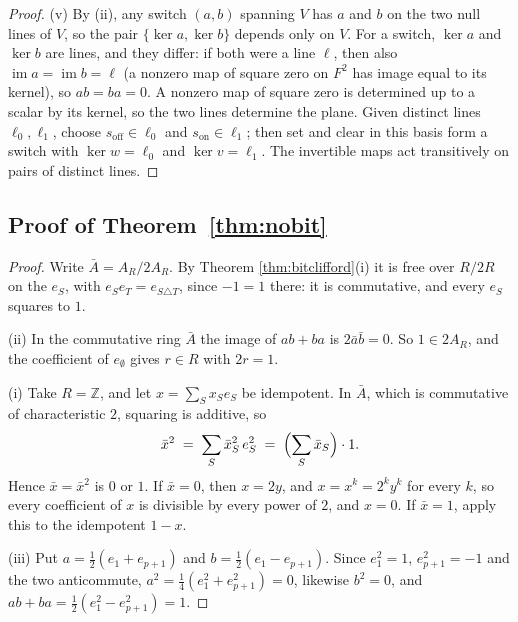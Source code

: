 \documentclass[11pt]{article}
\theoremstyle{plain}
\theoremstyle{definition}
\theoremstyle{plain}
\theoremstyle{definition}
\newcommand{\Z}{\mathbb{Z}}
\begin{document}
\begin{proof}
(v) By (ii), any switch $(a,b)$ spanning $V$ has $a$ and $b$ on the two null lines of $V$, so the pair $\{\ker a, \ker b\}$ depends only on $V$. For a switch, $\ker a$ and $\ker b$ are lines, and they differ: if both were a line $\ell$, then also $\operatorname{im}a = \operatorname{im}b = \ell$ (a nonzero map of square zero on $F^{2}$ has image equal to its kernel), so $ab = ba = 0$. A nonzero map of square zero is determined up to a scalar by its kernel, so the two lines determine the plane. Given distinct lines $\ell_{0}, \ell_{1}$, choose $s_{\mathrm{off}} \in \ell_{0}$ and $s_{\mathrm{on}} \in \ell_{1}$; then set and clear in this basis form a switch with $\ker w = \ell_{0}$ and $\ker v = \ell_{1}$. The invertible maps act transitively on pairs of distinct lines.
\end{proof}

\subsection{\texorpdfstring{Proof of Theorem~\ref{thm:nobit}}{Proof of Theorem 7.4}}\label{prf:thm:nobit}

\begin{proof}
Write $\bar{A} = A_{R}/2A_{R}$. By Theorem \ref{thm:bitclifford}(i) it is free over $R/2R$ on the $e_{S}$, with $e_{S}e_{T} = e_{S \triangle T}$, since $-1 = 1$ there: it is commutative, and every $e_{S}$ squares to $1$.

(ii) In the commutative ring $\bar{A}$ the image of $ab + ba$ is $2\bar{a}\bar{b} = 0$. So $1 \in 2A_{R}$, and the coefficient of $e_{\emptyset}$ gives $r \in R$ with $2r = 1$.

(i) Take $R = \Z$, and let $x = \sum_{S} x_{S}e_{S}$ be idempotent. In $\bar{A}$, which is commutative of characteristic $2$, squaring is additive, so
\[
\bar{x}^{2} \;=\; \sum_{S} \bar{x}_{S}^{2}\,e_{S}^{2} \;=\; \Bigl(\sum_{S} \bar{x}_{S}\Bigr)\cdot 1 .
\]
Hence $\bar{x} = \bar{x}^{2}$ is $0$ or $1$. If $\bar{x} = 0$, then $x = 2y$, and $x = x^{k} = 2^{k}y^{k}$ for every $k$, so every coefficient of $x$ is divisible by every power of $2$, and $x = 0$. If $\bar{x} = 1$, apply this to the idempotent $1 - x$.

(iii) Put $a = \tfrac12(e_{1} + e_{p+1})$ and $b = \tfrac12(e_{1} - e_{p+1})$. Since $e_{1}^{2} = 1$, $e_{p+1}^{2} = -1$ and the two anticommute, $a^{2} = \tfrac14(e_{1}^{2} + e_{p+1}^{2}) = 0$, likewise $b^{2} = 0$, and $ab + ba = \tfrac12(e_{1}^{2} - e_{p+1}^{2}) = 1$.
\end{proof}
\end{document}
